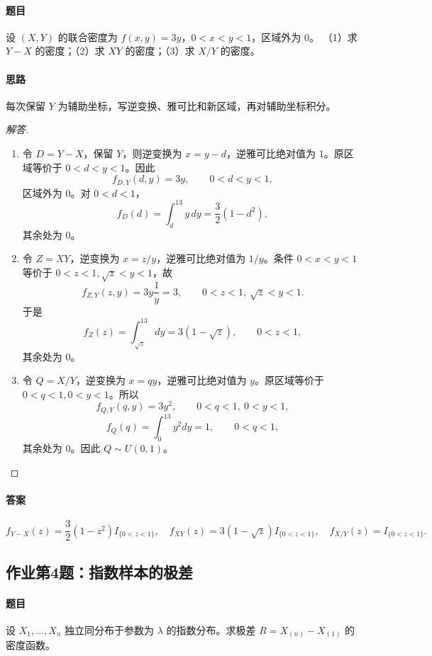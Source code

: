 \paragraph{题目}
设 $(X,Y)$ 的联合密度为 $f(x,y)=3y$，$0<x<y<1$，区域外为 $0$。
（1）求 $Y-X$ 的密度；（2）求 $XY$ 的密度；（3）求 $X/Y$ 的密度。
\paragraph{思路}每次保留 $Y$ 为辅助坐标，写逆变换、雅可比和新区域，再对辅助坐标积分。
\begin{proof}[解答]
\begin{enumerate}
\item 令 $D=Y-X$，保留 $Y$，则逆变换为 $x=y-d$，逆雅可比绝对值为 $1$。原区域等价于 $0<d<y<1$。因此
\[
f_{D,Y}(d,y)=3y,\qquad0<d<y<1,
\]
区域外为 $0$。对 $0<d<1$，
\[
f_D(d)=\int_d^13y\,dy=\frac32(1-d^2),
\]
其余处为 $0$。
\item 令 $Z=XY$，逆变换为 $x=z/y$，逆雅可比绝对值为 $1/y$。条件 $0<x<y<1$ 等价于 $0<z<1,\sqrt z<y<1$，故
\[
f_{Z,Y}(z,y)=3y\frac1y=3,\qquad0<z<1,\ \sqrt z<y<1.
\]
于是
\[
f_Z(z)=\int_{\sqrt z}^13\,dy=3(1-\sqrt z),\qquad0<z<1,
\]
其余处为 $0$。
\item 令 $Q=X/Y$，逆变换为 $x=qy$，逆雅可比绝对值为 $y$。原区域等价于 $0<q<1,0<y<1$。所以
\[
f_{Q,Y}(q,y)=3y^2,\qquad0<q<1,\ 0<y<1,
\]
\[
f_Q(q)=\int_0^13y^2dy=1,\qquad0<q<1,
\]
其余处为 $0$。因此 $Q\sim U(0,1)$。
\end{enumerate}
\end{proof}
\paragraph{答案}
\[
f_{Y-X}(z)=\frac32(1-z^2)I_{\{0<z<1\}},\quad
f_{XY}(z)=3(1-\sqrt z)I_{\{0<z<1\}},\quad
f_{X/Y}(z)=I_{\{0<z<1\}}.
\]

\subsection{作业第4题：指数样本的极差}\label{ex:w12-h4}
\paragraph{题目}
设 $X_1,\ldots,X_n$ 独立同分布于参数为 $\lambda$ 的指数分布。求极差 $R=X_{(n)}-X_{(1)}$ 的密度函数。
